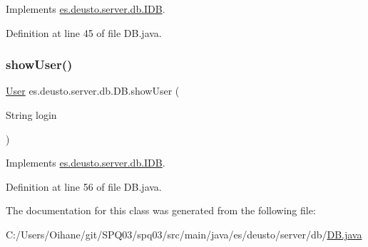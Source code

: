 Implements \hyperlink{interfacees_1_1deusto_1_1server_1_1db_1_1_i_d_b_a8a4f72bb5148aff5b6f82679a7650b29}{es.\+deusto.\+server.\+db.\+I\+DB}.



Definition at line 45 of file D\+B.\+java.

\mbox{\label{classes_1_1deusto_1_1server_1_1db_1_1_d_b_ac85523faea523033439a932bbcab2c7e}} 
\subsubsection{\texorpdfstring{show\+User()}{showUser()}}
{\footnotesize\ttfamily \hyperlink{classes_1_1deusto_1_1server_1_1db_1_1data_1_1_user}{User} es.\+deusto.\+server.\+db.\+D\+B.\+show\+User (\begin{DoxyParamCaption}\item[{String}]{login }\end{DoxyParamCaption})}



Implements \hyperlink{interfacees_1_1deusto_1_1server_1_1db_1_1_i_d_b_aa2f6a5291fa8aa78d5a73b5878d17986}{es.\+deusto.\+server.\+db.\+I\+DB}.



Definition at line 56 of file D\+B.\+java.



The documentation for this class was generated from the following file\+:\begin{DoxyCompactItemize}
\item 
C\+:/\+Users/\+Oihane/git/\+S\+P\+Q03/spq03/src/main/java/es/deusto/server/db/\hyperlink{_d_b_8java}{D\+B.\+java}\end{DoxyCompactItemize}
